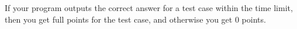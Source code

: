If your program outputs the correct answer for a test case within the time limit, then you
get full points for the test case, and otherwise you get $0$ points.